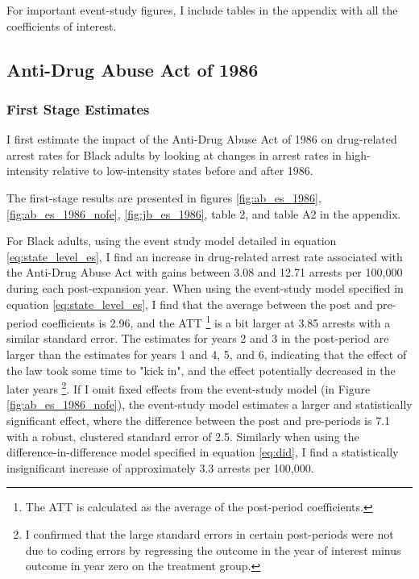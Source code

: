 \documentclass{article}
\begin{document}
For important event-study figures, I include tables in the appendix with all the coefficients of interest.

\subsection{Anti-Drug Abuse Act of 1986}

\subsubsection{First Stage Estimates}

I first estimate the impact of the Anti-Drug Abuse Act of 1986 on drug-related arrest rates for Black adults by looking at changes in arrest rates in high-intensity relative to low-intensity states before and after 1986.

The first-stage results are presented in figures \ref{fig:ab_es_1986}, \ref{fig:ab_es_1986_nofe}, \ref{fig:jb_es_1986}, table 2, and table A2 in the appendix. 

For Black adults, using the event study model detailed in equation \ref{eq:state_level_es}, I find an increase in drug-related arrest rate associated with the Anti-Drug Abuse Act with gains between 3.08 and 12.71 arrests per 100,000 during each post-expansion year. When using the event-study model specified in equation \ref{eq:state_level_es}, I find that the average between the post and pre-period coefficients is 2.96, and the ATT \footnote{The ATT is calculated as the average of the post-period coefficients.} is a bit larger at 3.85 arrests with a similar standard error. The estimates for years 2 and 3 in the post-period are larger than the estimates for years 1 and 4, 5, and 6, indicating that the effect of the law took some time to "kick in", and the effect potentially decreased in the later years \footnote{I confirmed that the large standard errors in certain post-periods were not due to coding errors by regressing the outcome in the year of interest minus outcome in year zero on the treatment group.}. If I omit fixed effects from the event-study model (in Figure \ref{fig:ab_es_1986_nofe}), the event-study model estimates a larger and statistically significant effect, where the difference between the post and pre-periods is 7.1 with a robust, clustered standard error of 2.5. Similarly when using the difference-in-difference model specified in equation \ref{eq:did}, I find a statistically insignificant increase of approximately 3.3 arrests per 100,000. 
\end{document}
